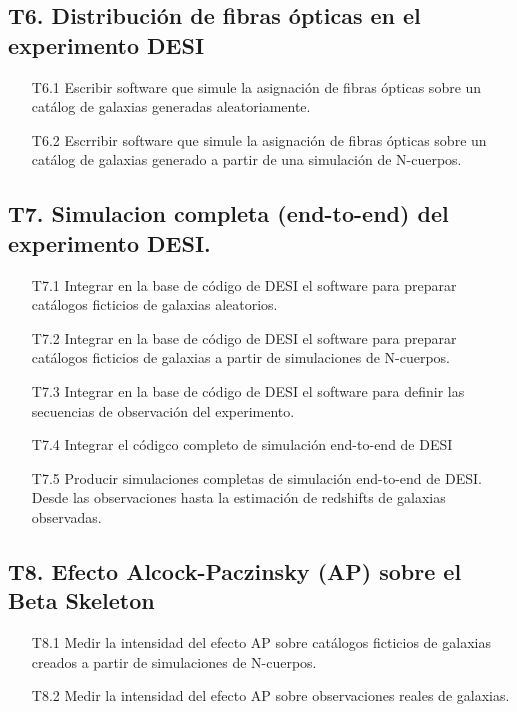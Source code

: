 \subsection*{T6. Distribuci\'on de fibras \'opticas en el experimento DESI}
\begin{itemize}
\item[T6.1] Escribir software que simule la asignaci\'on de fibras
  \'opticas sobre un cat\'alog de galaxias generadas aleatoriamente. 
\item[T6.2] Escrribir software que simule la asignaci\'on de fibras
  \'opticas sobre un cat\'alog de galaxias generado a partir de una
  simulaci\'on de N-cuerpos.
\end{itemize}

\subsection*{T7. Simulacion completa (end-to-end) del experimento DESI.}
\begin{itemize}
\item[T7.1] Integrar en la base de c\'odigo de DESI el software para
  preparar cat\'alogos ficticios de galaxias aleatorios.
\item[T7.2] Integrar en la base de c\'odigo de DESI el software para
  preparar cat\'alogos ficticios de galaxias a partir de simulaciones
  de N-cuerpos.
\item[T7.3] Integrar en la base de c\'odigo de DESI el software para
  definir las secuencias de observaci\'on del experimento.
\item[T7.4] Integrar el c\'odigco completo de simulaci\'on end-to-end
  de DESI
\item[T7.5] Producir simulaciones completas de simulaci\'on end-to-end
  de DESI. Desde las observaciones hasta la estimaci\'on de redshifts
  de galaxias observadas.
\end{itemize}

\subsection*{T8. Efecto Alcock-Paczinsky (AP) sobre el Beta Skeleton}
\begin{itemize}
\item[T8.1] Medir la intensidad del efecto AP sobre cat\'alogos
  ficticios de galaxias creados a partir de simulaciones de N-cuerpos.
\item[T8.2] Medir la intensidad del efecto AP sobre observaciones
  reales de galaxias.
\end{itemize}


